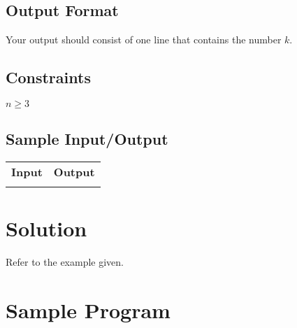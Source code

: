 \documentclass[12pt]{report}
\begin{document}
	\subsection*{Output Format}
	Your output should consist of one line that contains the number $k$.

	\subsection*{Constraints}
	$n\geq3$

	\subsection*{Sample Input/Output}
	\begin{tabular}{ |l|l| } 
		\hline
		\textbf{Input} & \textbf{Output} \\
		{} & {} \\ %
		\hline
	\end{tabular}


	\section*{Solution}
	Refer to the example given.



	\section*{Sample Program}
	
	
\end{document}
